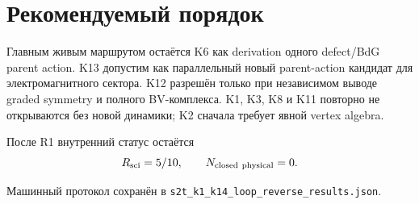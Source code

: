 \section{Рекомендуемый порядок}

Главным живым маршрутом остаётся K6 как derivation одного defect/BdG
parent action. K13 допустим как параллельный новый parent-action кандидат
для электромагнитного сектора. K12 разрешён только при независимом выводе
graded symmetry и полного BV-комплекса. K1, K3, K8 и K11 повторно не
открываются без новой динамики; K2 сначала требует явной vertex algebra.

После R1 внутренний статус остаётся
\begin{equation}
 R_{\rm sci}=5/10,
 \qquad
 N_{\rm closed\ physical}=0.
\end{equation}

Машинный протокол сохранён в
\texttt{s2t\_k1\_k14\_loop\_reverse\_results.json}.